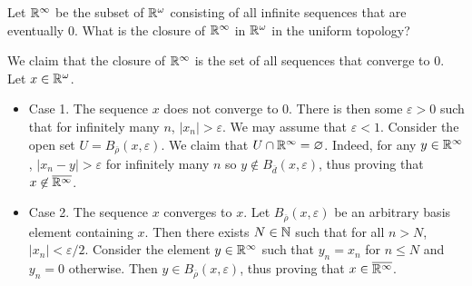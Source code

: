 	\setcounter{exercise}{4}
	\begin{exercise}
		Let $\mathbb{R}^\infty$ be the subset of $\mathbb{R}^\omega$ consisting of all infinite sequences that are eventually $0$. What is the closure of $\mathbb{R}^\infty$ in $\mathbb{R}^\omega$ in the uniform topology?
	\end{exercise}
	\begin{solution*}
		We claim that the closure of $\mathbb{R}^\infty$ is the set of all sequences that converge to $0$. Let $x\in\mathbb{R}^\omega$.
		\begin{itemize}
			\item Case 1. The sequence $x$ does not converge to $0$. There is then some $\varepsilon>0$ such that for infinitely many $n$, $|x_n|>\varepsilon$. We may assume that $\varepsilon<1$. Consider the open set $U = B_{\overline{\rho}}(x,\varepsilon)$. We claim that $U\cap\mathbb{R}^\infty = \varnothing$. Indeed, for any $y\in\mathbb{R}^\infty$, $|x_n-y|>\varepsilon$ for infinitely many $n$ so $y\not\in B_{\overline{d}}(x,\varepsilon)$, thus proving that $x\not\in\overline{\mathbb{R}^\infty}$.
			\item Case 2. The sequence $x$ converges to $x$. Let $B_{\overline{\rho}}(x,\varepsilon)$ be an arbitrary basis element containing $x$. Then there exists $N\in\mathbb{N}$ such that for all $n>N$, $|x_n|<\varepsilon/2$. Consider the element $y\in\mathbb{R}^\infty$ such that $y_n=x_n$ for $n\leq N$ and $y_n=0$ otherwise. Then $y\in B_{\overline{\rho}}(x,\varepsilon)$, thus proving that $x\in\overline{\mathbb{R}^\infty}$.
		\end{itemize}
	\end{solution*}


